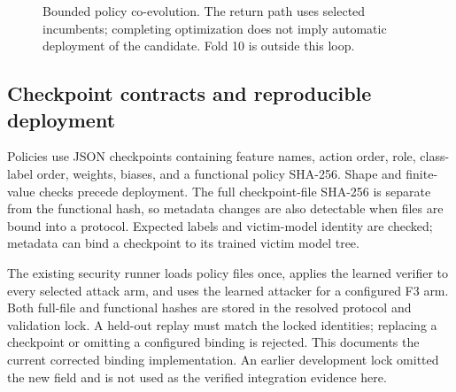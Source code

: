 \begin{figure}[htbp]\centering
{}
\caption{Bounded policy co-evolution. The return path uses selected incumbents; completing optimization does not imply automatic deployment of the candidate. Fold 10 is outside this loop.}
\label{fig:evolution}\end{figure}

\subsection{Checkpoint contracts and reproducible deployment}
Policies use JSON checkpoints containing feature names, action order, role, class-label order, weights, biases, and a functional policy SHA-256. Shape and finite-value checks precede deployment. The full checkpoint-file SHA-256 is separate from the functional hash, so metadata changes are also detectable when files are bound into a protocol. Expected labels and victim-model identity are checked; metadata can bind a checkpoint to its trained victim model tree.

The existing security runner loads policy files once, applies the learned verifier to every selected attack arm, and uses the learned attacker for a configured F3 arm. Both full-file and functional hashes are stored in the resolved protocol and validation lock. A held-out replay must match the locked identities; replacing a checkpoint or omitting a configured binding is rejected. This documents the current corrected binding implementation. An earlier development lock omitted the new field and is not used as the verified integration evidence here.

